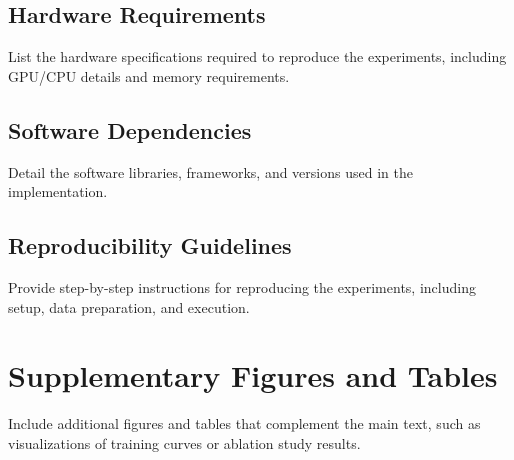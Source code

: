 \documentclass[
	english,
	ruledheaders=section,
	class=report,
	thesis={type=master},
	accentcolor=9c,
	custommargins=true,
	marginpar=false,
	parskip=half-,
	fontsize=11pt,
]{tudapub}
\begin{document}
\section{Hardware Requirements}
\label{app:hardware_requirements}
List the hardware specifications required to reproduce the experiments, including GPU/CPU details and memory requirements.

\section{Software Dependencies}
\label{app:software_dependencies}
Detail the software libraries, frameworks, and versions used in the implementation.

\section{Reproducibility Guidelines}
\label{app:reproducibility}
Provide step-by-step instructions for reproducing the experiments, including setup, data preparation, and execution.

\chapter{Supplementary Figures and Tables}
Include additional figures and tables that complement the main text, such as visualizations of training curves or ablation study results.
\label{app:supplementary}
\end{document}
